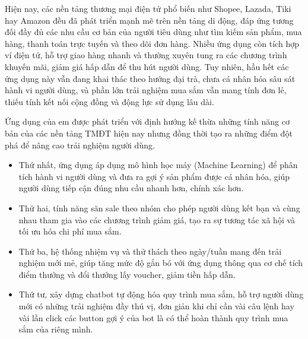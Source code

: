 \documentclass[../DoAn.tex]{subfiles}
\begin{document}
Hiện nay, các nền tảng thương mại điện tử phổ biến như Shopee, Lazada, Tiki hay Amazon đều đã phát triển mạnh mẽ trên nền tảng di động, đáp ứng tương đối đầy đủ các nhu cầu cơ bản của người tiêu dùng như tìm kiếm sản phẩm, mua hàng, thanh toán trực tuyến và theo dõi đơn hàng. Nhiều ứng dụng còn tích hợp ví điện tử, hỗ trợ giao hàng nhanh và thường xuyên tung ra các chương trình khuyến mãi, giảm giá hấp dẫn để thu hút người dùng. Tuy nhiên, hầu hết các ứng dụng này vẫn đang khai thác theo hướng đại trà, chưa cá nhân hóa sâu sát hành vi người dùng, và phần lớn trải nghiệm mua sắm vẫn mang tính đơn lẻ, thiếu tính kết nối cộng đồng và động lực sử dụng lâu dài.

Ứng dụng của em được phát triển với định hướng kế thừa những tính năng cơ bản của các nền tảng TMĐT hiện nay nhưng đồng thời tạo ra những điểm đột phá để nâng cao trải nghiệm người dùng. 

\begin{itemize}

\item Thứ nhất, ứng dụng áp dụng mô hình học máy (Machine Learning) để phân tích hành vi người dùng và đưa ra gợi ý sản phẩm được cá nhân hóa, giúp người dùng tiếp cận đúng nhu cầu nhanh hơn, chính xác hơn. 
\item Thứ hai, tính năng săn sale theo nhóm cho phép người dùng kết bạn và cùng nhau tham gia vào các chương trình giảm giá, tạo ra sự tương tác xã hội và tối ưu hóa chi phí mua sắm.
\item Thứ ba, hệ thống nhiệm vụ và thử thách theo ngày/tuần mang đến trải nghiệm mới mẻ, giúp tăng mức độ gắn bó với ứng dụng thông qua cơ chế tích điểm thưởng và đổi thưởng lấy voucher, giảm tiền hấp dẫn.
\item Thứ tư, xây dựng chatbot tự động hóa quy trình mua sắm, hỗ trợ người dùng mới có những trải nghiệm đầy thú vị, đơn giản khi chỉ cần vài câu lệnh hay vài lần click các button gợi ý của bot là có thể hoàn thành quy trình mua sắm của riêng mình.
\end{itemize}

\end{document}
